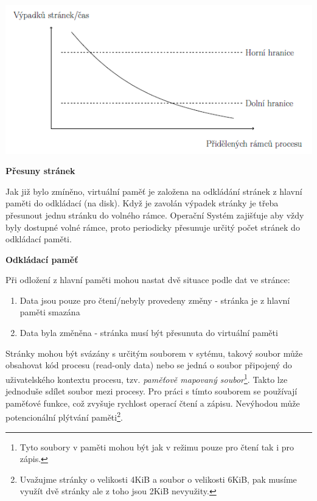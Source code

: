 \begin{center}
    \includegraphics[scale=1]{images/mem_freq_page.png}
\end{center}

\begin{Large}
    \vspace{0,5cm}
    \textbf{Přesuny stránek}
\end{Large}

Jak již bylo zmíněno, virtuální paměť je založena na odkládání stránek z hlavní paměti do odkládací (na disk). Když je zavolán výpadek stránky je třeba přesunout jednu stránku do volného rámce. Operační Systém zajišťuje aby vždy byly dostupné volné rámce, proto periodicky přesunuje určitý počet stránek do odkládací paměti. 

\begin{large}
    \vspace{0,5cm}
    \textbf{Odkládací paměť}
\end{large}

Při odložení z hlavní paměti mohou nastat dvě situace podle dat ve stránce:

\begin{enumerate}
    \item Data jsou pouze pro čtení/nebyly provedeny změny - stránka je z hlavní paměti smazána
    \item Data byla změněna - stránka musí být přesunuta do virtuální paměti
\end{enumerate}

Stránky mohou být svázány s určitým souborem v sytému, takový soubor může obsahovat kód procesu (read-only data) nebo se jedná o soubor připojený do uživatelského kontextu procesu, tzv. \textit{paměťově mapovaný soubor}\footnote{Tyto soubory v paměti mohou být jak v režimu pouze pro čtení tak i pro zápis.}. Takto lze jednoduše sdílet soubor mezi procesy. Pro práci s tímto souborem se používají paměťové funkce, což zvyšuje rychlost operací čtení a zápisu. Nevýhodou může potencionální plýtvání paměti\footnote{Uvažujme stránky o velikosti 4KiB a soubor o velikosti 6KiB, pak musíme využít dvě stránky ale z toho jsou 2KiB nevyužity.}. 

